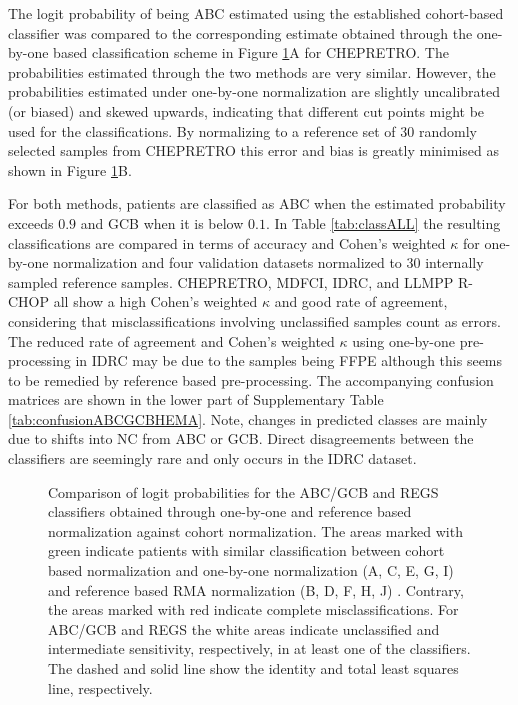 \documentclass[10pt,letterpaper]{article}
\begin{document}
The logit probability of being ABC estimated using the established cohort-based classifier was compared to the corresponding estimate obtained through the one-by-one based classification scheme in Figure \ref{fig:ABCGCBDrug}A for CHEPRETRO.
The probabilities estimated through the two methods are very similar.
However, the probabilities estimated under one-by-one normalization are slightly uncalibrated (or biased) and skewed upwards, indicating that different cut points might be used for the classifications.
By normalizing to a reference set of $30$ randomly selected samples from CHEPRETRO this error and bias is greatly minimised as shown in Figure \ref{fig:ABCGCBDrug}B.

For both methods, patients are classified as ABC when the estimated probability exceeds $0.9$ and GCB when it is below $0.1$.
In Table \ref{tab:classALL} the resulting classifications are compared in terms of accuracy and Cohen's weighted $\kappa$ for one-by-one normalization and four validation datasets normalized to 30 internally sampled reference samples.
CHEPRETRO, MDFCI, IDRC, and LLMPP R-CHOP all show a high Cohen's weighted $\kappa$ and good rate of agreement, considering that misclassifications involving unclassified samples count as errors.
The reduced rate of agreement and Cohen's weighted $\kappa$ using one-by-one pre-processing in IDRC may be due to the samples being FFPE although this seems to be remedied by reference based pre-processing.
The accompanying confusion matrices are shown in the lower part of Supplementary Table \ref{tab:confusionABCGCBHEMA}.
Note, changes in predicted classes are mainly due to shifts into NC from ABC or GCB.
Direct disagreements between the classifiers are seemingly rare and only occurs in the IDRC dataset.



\begin{figure}[!ht]
\caption{
Comparison of logit probabilities for the ABC/GCB and REGS classifiers obtained through one-by-one and reference based normalization against cohort normalization.
The areas marked with green indicate patients with similar classification between cohort based normalization and one-by-one normalization (A, C, E, G, I)  and reference based RMA normalization (B, D, F, H, J) .
Contrary, the areas marked with red indicate complete misclassifications.
For ABC/GCB and REGS the white areas indicate unclassified and intermediate sensitivity, respectively, in at least one of the classifiers.
The dashed and solid line show the identity and total least squares line, respectively.
}
\label{fig:ABCGCBDrug}
\end{figure}
\end{document}
